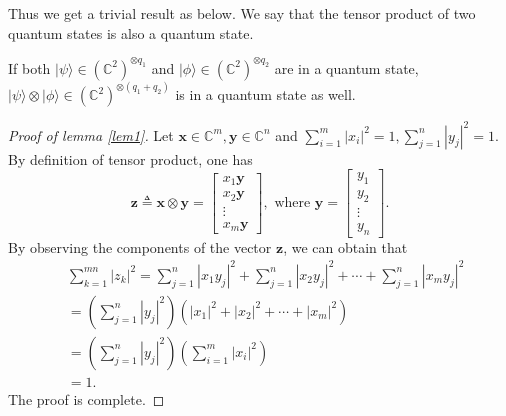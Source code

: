Thus we get a trivial result as below. We say that the tensor product of two quantum states is also a quantum state. 

\begin{corollary}\label{cor1}
If both $|\psi\rangle \in \left(\mathbb{C}^2\right)^{\otimes q_{1}}$ and $|\phi\rangle  \in \left(\mathbb{C}^2\right)^{\otimes q_{2}}$ are in a quantum state, $|\psi\rangle \otimes|\phi\rangle \in \left(\mathbb{C}^2\right)^{\otimes (q_{1}+q_{2})}$ is in a quantum state as well.
\end{corollary}

\begin{proof}[Proof of lemma \ref{lem1}]
    Let $\mathbf{x} \in \mathbb{C}^m,\mathbf{y} \in \mathbb{C}^n$ and $\sum_{i=1}^m\left|x_i\right|^2=1, \sum_{j=1}^n\left|y_j\right|^2=1.$
    By definition of tensor product, one has
    \begin{equation}
    \mathbf{z} \triangleq \mathbf{x} \otimes \mathbf{y}=\left[\begin{array}{c}
    x_1 \mathbf{y} \\
    x_2 \mathbf{y} \\
    \vdots \\
    x_m \mathbf{y}
    \end{array}\right], \text { where } \mathbf{y}=\left[\begin{array}{c}
    y_1 \\
    y_2 \\
    \vdots \\
    y_n
    \end{array}\right].
\end{equation}
    By observing the components of the vector $\mathbf{z}$, we can obtain that
    \begin{equation}
        \begin{aligned}
        & \sum_{k=1}^{m n}\left|z_k\right|^2=\sum_{j=1}^n\left|x_1 y_j\right|^2+\sum_{j=1}^n\left|x_2 y_j\right|^2+\cdots+\sum_{j=1}^n\left|x_m y_j\right|^2 \\
        & =\left(\sum_{j=1}^n\left|y_j\right|^2\right)\left(\left|x_1\right|^2+\left|x_2\right|^2+\cdots+\left|x_m\right|^2\right) \\
        & =\left(\sum_{j=1}^n\left|y_j\right|^2\right)
        \left(\sum_{i=1}^m\left|x_i\right|^2\right) \\
        & =1.
        \end{aligned}
\end{equation}
    The proof is complete.
\end{proof}


